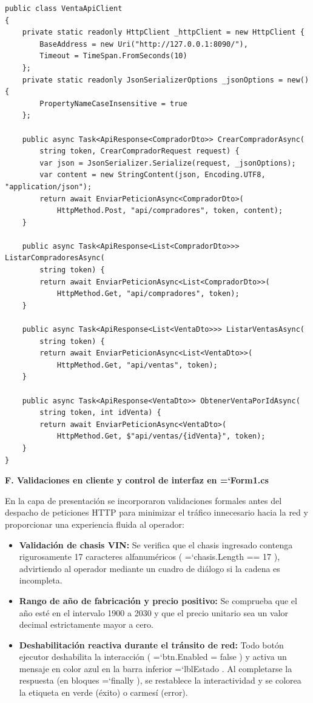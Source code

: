 \documentclass[11pt,a4paper]{article}
\renewcommand{\_}{\oldunderscore\allowbreak}
\DeclareRobustCommand{\texttt}[1]{%
  {\upshape\ttfamily\fontsize{9}{10.8}\selectfont\hyphenchar\font=`\-\relax #1}%
}
\begin{document}
\begin{lstlisting}
public class VentaApiClient
{
    private static readonly HttpClient _httpClient = new HttpClient {
        BaseAddress = new Uri("http://127.0.0.1:8090/"),
        Timeout = TimeSpan.FromSeconds(10)
    };
    private static readonly JsonSerializerOptions _jsonOptions = new() {
        PropertyNameCaseInsensitive = true
    };

    public async Task<ApiResponse<CompradorDto>> CrearCompradorAsync(
        string token, CrearCompradorRequest request) {
        var json = JsonSerializer.Serialize(request, _jsonOptions);
        var content = new StringContent(json, Encoding.UTF8, "application/json");
        return await EnviarPeticionAsync<CompradorDto>(
            HttpMethod.Post, "api/compradores", token, content);
    }

    public async Task<ApiResponse<List<CompradorDto>>> ListarCompradoresAsync(
        string token) {
        return await EnviarPeticionAsync<List<CompradorDto>>(
            HttpMethod.Get, "api/compradores", token);
    }

    public async Task<ApiResponse<List<VentaDto>>> ListarVentasAsync(
        string token) {
        return await EnviarPeticionAsync<List<VentaDto>>(
            HttpMethod.Get, "api/ventas", token);
    }

    public async Task<ApiResponse<VentaDto>> ObtenerVentaPorIdAsync(
        string token, int idVenta) {
        return await EnviarPeticionAsync<VentaDto>(
            HttpMethod.Get, $"api/ventas/{idVenta}", token);
    }
}
\end{lstlisting}

\vspace{0.2cm}
\noindent\textbf{F. Validaciones en cliente y control de interfaz en \texttt{Form1.cs}}

\noindent En la capa de presentación se incorporaron validaciones formales antes del despacho de peticiones HTTP para minimizar el tráfico innecesario hacia la red y proporcionar una experiencia fluida al operador:
\begin{itemize}[leftmargin=*,itemsep=2pt,topsep=1pt]
  \item \textbf{Validación de chasis VIN:} Se verifica que el chasis ingresado contenga rigurosamente 17 caracteres alfanuméricos (\texttt{chasis.\allowbreak{}Length =\allowbreak{}= 17}), advirtiendo al operador mediante un cuadro de diálogo si la cadena es incompleta.
  \item \textbf{Rango de año de fabricación y precio positivo:} Se comprueba que el año esté en el intervalo 1900 a 2030 y que el precio unitario sea un valor decimal estrictamente mayor a cero.
  \item \textbf{Deshabilitación reactiva durante el tránsito de red:} Todo botón ejecutor deshabilita la interacción (\texttt{btn.\allowbreak{}Enabled = false}) y activa un mensaje en color azul en la barra inferior \texttt{lblEstado}. Al completarse la respuesta (en bloques \texttt{finally}), se restablece la interactividad y se colorea la etiqueta en verde (éxito) o carmesí (error).
\end{itemize}
\end{document}

